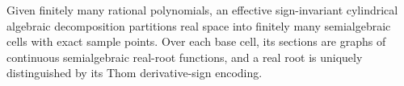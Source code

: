 Given finitely many rational polynomials, an effective sign-invariant cylindrical algebraic decomposition partitions real space into finitely many semialgebraic cells with exact sample points.  Over each base cell, its sections are graphs of continuous semialgebraic real-root functions, and a real root is uniquely distinguished by its Thom derivative-sign encoding.